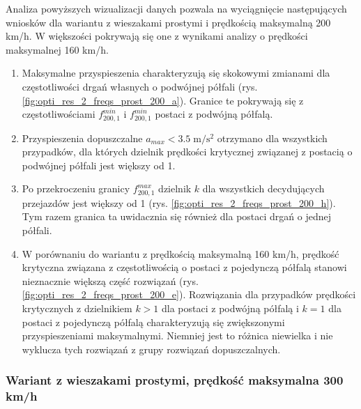 Analiza powyższych wizualizacji danych pozwala na wyciągnięcie następujących wniosków dla wariantu z wieszakami prostymi i prędkością maksymalną 200 km/h. W większości pokrywają się one z wynikami analizy o prędkości maksymalnej 160 km/h.
\begin{enumerate}
	\item Maksymalne przyspieszenia charakteryzują się skokowymi zmianami dla częstotliwości drgań własnych o podwójnej półfali (rys. \ref{fig:opti_res_2_freqs_prost_200_a}). Granice te pokrywają się z częstotliwościami $f_{200,1}^{min}$ i $f_{200,1}^{min}$ postaci z podwójną półfalą. 
	\item Przyspieszenia dopuszczalne $a_{max}<3.5\;\mathrm{m/s^2}$ otrzymano dla wszystkich przypadków, dla których dzielnik prędkości krytycznej związanej z postacią o podwójnej półfali jest większy od 1.
	\item Po przekroczeniu granicy $f_{200,1}^{max}$  dzielnik $k$ dla wszystkich decydujących przejazdów jest większy od 1 (rys. \ref{fig:opti_res_2_freqs_prost_200_h}). Tym razem granica ta uwidacznia się również dla postaci drgań o jednej półfali. 

	\item W porównaniu do wariantu z prędkością maksymalną 160 km/h, prędkość krytyczna związana z częstotliwością o postaci z pojedynczą półfalą stanowi nieznacznie większą część rozwiązań (rys. \ref{fig:opti_res_2_freqs_prost_200_e}). Rozwiązania dla przypadków prędkości krytycznych z dzielnikiem $k>1$ dla postaci z podwójną półfalą i $k=1$ dla postaci z pojedynczą półfalą charakteryzują się zwiększonymi przyspieszeniami maksymalnymi. Niemniej jest to różnica niewielka i nie wyklucza tych rozwiązań z grupy rozwiązań dopuszczalnych.
\end{enumerate}
\vfill

\subsubsection{Wariant z wieszakami prostymi, prędkość maksymalna 300 km/h}


